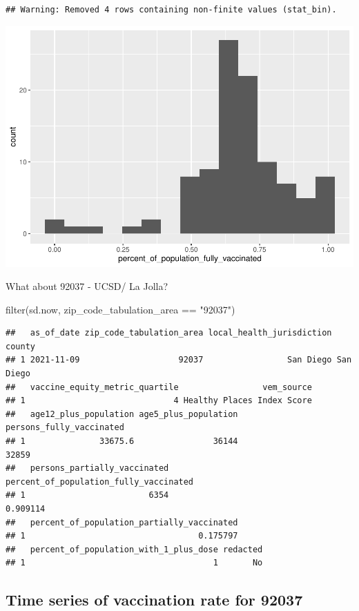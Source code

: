 \documentclass[
]{article}
\newenvironment{Shaded}{\begin{snugshade}}{\end{snugshade}}
\newcommand{\FunctionTok}[1]{\textcolor[rgb]{0.00,0.00,0.00}{#1}}
\newcommand{\NormalTok}[1]{#1}
\newcommand{\SpecialCharTok}[1]{\textcolor[rgb]{0.00,0.00,0.00}{#1}}
\newcommand{\StringTok}[1]{\textcolor[rgb]{0.31,0.60,0.02}{#1}}
\begin{document}
\begin{verbatim}
## Warning: Removed 4 rows containing non-finite values (stat_bin).
\end{verbatim}

\includegraphics{class17_files/figure-latex/unnamed-chunk-23-1.pdf}

What about 92037 - UCSD/ La Jolla?

\begin{Shaded}
\begin{Highlighting}[]
\FunctionTok{filter}\NormalTok{(sd.now, zip\_code\_tabulation\_area }\SpecialCharTok{==} \StringTok{"92037"}\NormalTok{)}
\end{Highlighting}
\end{Shaded}

\begin{verbatim}
##   as_of_date zip_code_tabulation_area local_health_jurisdiction    county
## 1 2021-11-09                    92037                 San Diego San Diego
##   vaccine_equity_metric_quartile                 vem_source
## 1                              4 Healthy Places Index Score
##   age12_plus_population age5_plus_population persons_fully_vaccinated
## 1               33675.6                36144                    32859
##   persons_partially_vaccinated percent_of_population_fully_vaccinated
## 1                         6354                               0.909114
##   percent_of_population_partially_vaccinated
## 1                                   0.175797
##   percent_of_population_with_1_plus_dose redacted
## 1                                      1       No
\end{verbatim}

\hypertarget{time-series-of-vaccination-rate-for-92037}{%
\subsection{Time series of vaccination rate for
92037}\label{time-series-of-vaccination-rate-for-92037}}
\end{document}
